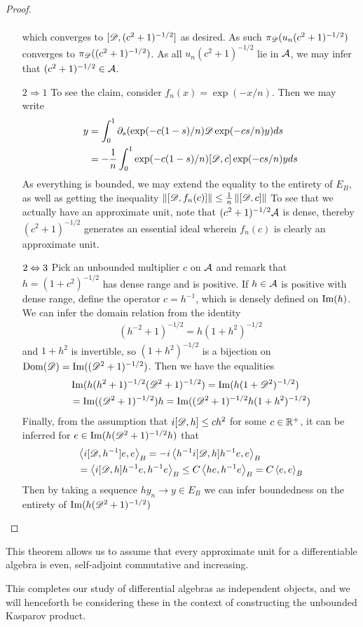\begin{proof}
\begin{itemize}
\begin{align*}
		\end{align*}
		which converges to $[\mathscr{D},(c^2+1)^{-1/2}]$ as desired. As such $\pi_{\mathscr{D}}(u_n(c^2+1)^{-1/2})$ converges to $\pi_{\mathscr{D}}((c^2+1)^{-1/2})$. As all $u_n(c^2+1)^{-1/2}$ lie in $\mathcal{A}$, we may infer that $(c^2+1)^{-1/2}\in \mathcal{A}$. 
	\item[$2\Rightarrow 1$]
		To see the claim, consider $f_n(x)=\exp(-x/n)$. Then we may write 
		\begin{align*}
			[\D,f_n(c)]y&=\int_0^1 \part_s (\exp(-c(1-s)/n)\D \exp(-cs/n)y)ds \\
			&=-\frac{1}{n}\int_0^1 \exp(-c(1-s)/n)[\D,c]\exp(-cs/n)yds 
		\end{align*}
		As everything is bounded, we may extend the equality to the entirety of $E_B$, as well as getting the inequality $\left \Vert [\mathscr{D},f_n(c)] \right \Vert\leq \frac{1}{n}\left \Vert [\mathscr{D},c] \right \Vert$
		To see that we actually have an approximate unit, note that $(c^2+1)^{-1/2}\mathcal{A}$ is dense, thereby $(c^2+1)^{-1/2}$ generates an essential ideal wherein $f_n(c)$ is clearly an approximate unit. 
	\item[$2\Leftrightarrow 3$]
		Pick an unbounded multiplier $c$ on $\mathcal{A}$ and remark that $h=(1+c^2)^{-1/2}$ has dense range and is positive. If $h\in \mathcal{A}$ is positive with dense range, define the operator $c=h^{-1}$, which is densely defined on $\operatorname{Im}(h)$. We can infer the domain relation from the identity
		\begin{align*}
			(h^{-2}+1)^{-1/2}=h(1+h^2)^{-1/2}
		\end{align*}
		and $1+h^2$ is invertible, so $(1+h^2)^{-1/2}$ is a bijection on $\operatorname{Dom}(\mathscr{D})=\operatorname{Im}( (\mathscr{D}^2+1)^{-1/2})$. Then we have the equalities
		\begin{align*}
			&\operatorname{Im}(h(h^2+1)^{-1/2}(\mathscr{D}^2+1)^{-1/2})=\operatorname{Im} (h(1+\mathscr{D}^2)^{-1/2}) \\
			&=\operatorname{Im} ((\mathscr{D}^2+1)^{-1/2}) h=\operatorname{Im} ((\mathscr{D}^2+1)^{-1/2}h(1+h^2)^{-1/2})
		\end{align*}
		Finally, from the assumption that $i[\mathscr{D},h]\leq ch^2$ for some $c\in \mathbb{R}^+$, it can be inferred for $e\in \operatorname{Im}(h(\mathscr{D}^2+1)^{-1/2}h)$ that
		\begin{align*}
			&\left \langle i[\mathscr{D},h^{-1}]e,e \right \rangle_B=-i\left \langle h^{-1}i[\mathscr{D},h]h^{-1}e,e \right \rangle_B \\
			&=\left \langle i[\mathscr{D},h]h^{-1}e,h^{-1}e \right \rangle_B\leq C\left \langle he,h^{-1}e \right \rangle_B=C\left \langle e,e \right \rangle_B
		\end{align*}
		Then by taking a sequence $hy_n\to y\in E_B$ we can infer boundedness on the entirety of $\operatorname{Im}(h(\mathscr{D}^2+1)^{-1/2})$
\end{itemize}
\end{proof}
\begin{remark}
This theorem allows us to assume that every approximate unit for a differentiable algebra is even, self-adjoint commutative and increasing.
\end{remark} This completes our study of differential algebras as independent objects, and we will henceforth be considering these in the context of constructing the unbounded Kasparov product.
